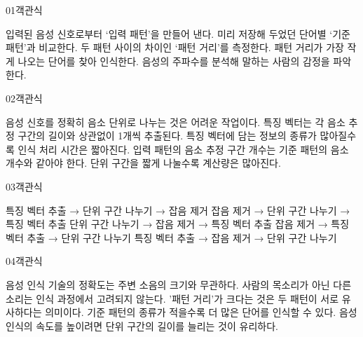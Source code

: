 \documentclass[fs9,seriesRus]{korfarm-base}
\begin{document}
\par\medskip
\kfBeginMC
\begin{kfQBlock}{01}{객관식}
\begin{kfChoices}
\kfChoice 입력된 음성 신호로부터 ‘입력 패턴’을 만들어 낸다.
\kfChoice 미리 저장해 두었던 단어별 ‘기준 패턴’과 비교한다.
\kfChoice 두 패턴 사이의 차이인 ‘패턴 거리’를 측정한다.
\kfChoice 패턴 거리가 가장 작게 나오는 단어를 찾아 인식한다.
\kfChoice 음성의 주파수를 분석해 말하는 사람의 감정을 파악한다.
\end{kfChoices}
\end{kfQBlock}
\begin{kfQBlock}{02}{객관식}
\begin{kfChoices}
\kfChoice 음성 신호를 정확히 음소 단위로 나누는 것은 어려운 작업이다.
\kfChoice 특징 벡터는 각 음소 추정 구간의 길이와 상관없이 1개씩 추출된다.
\kfChoice 특징 벡터에 담는 정보의 종류가 많아질수록 인식 처리 시간은 짧아진다.
\kfChoice 입력 패턴의 음소 추정 구간 개수는 기준 패턴의 음소 개수와 같아야 한다.
\kfChoice 단위 구간을 짧게 나눌수록 계산량은 많아진다.
\end{kfChoices}
\end{kfQBlock}
\begin{kfQBlock}{03}{객관식}
\begin{kfChoices}
\kfChoice 특징 벡터 추출 → 단위 구간 나누기 → 잡음 제거
\kfChoice 잡음 제거 → 단위 구간 나누기 → 특징 벡터 추출
\kfChoice 단위 구간 나누기 → 잡음 제거 → 특징 벡터 추출
\kfChoice 잡음 제거 → 특징 벡터 추출 → 단위 구간 나누기
\kfChoice 특징 벡터 추출 → 잡음 제거 → 단위 구간 나누기
\end{kfChoices}
\end{kfQBlock}
\begin{kfQBlock}{04}{객관식}
\begin{kfChoices}
\kfChoice 음성 인식 기술의 정확도는 주변 소음의 크기와 무관하다.
\kfChoice 사람의 목소리가 아닌 다른 소리는 인식 과정에서 고려되지 않는다.
\kfChoice '패턴 거리'가 크다는 것은 두 패턴이 서로 유사하다는 의미이다.
\kfChoice 기준 패턴의 종류가 적을수록 더 많은 단어를 인식할 수 있다.
\kfChoice 음성 인식의 속도를 높이려면 단위 구간의 길이를 늘리는 것이 유리하다.
\end{kfChoices}
\end{kfQBlock}
\end{document}
